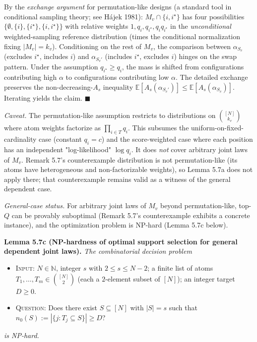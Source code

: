 \documentclass[
]{article}
\begin{document}
By the \emph{exchange argument} for permutation-like designs (a
standard tool in conditional sampling theory; see Hájek 1981):
$M_v \cap \{i, i^\star\}$ has four possibilities
$\{\emptyset, \{i\}, \{i^\star\}, \{i, i^\star\}\}$ with relative
weights $1, q_i, q_{i^\star}, q_i q_{i^\star}$ in the
\emph{unconditional} weighted-sampling reference distribution
(times the conditional normalization fixing $|M_v| = k_v$). Conditioning on the rest of $M_v$, the comparison
between $\alpha_{S_v}$ (excludes $i^\star$, includes $i$) and
$\alpha_{S_v'}$ (includes $i^\star$, excludes $i$) hinges on the
swap pattern. Under the assumption $q_{i^\star} \geq q_i$, the mass
is shifted from configurations contributing high $\alpha$ to
configurations contributing low $\alpha$. The detailed exchange
preserves the non-decreasing-$A_s$ inequality
$\mathbb{E}[A_s(\alpha_{S_v'})] \leq \mathbb{E}[A_s(\alpha_{S_v})]$.
Iterating yields the claim. \hfill$\blacksquare$

\emph{Caveat.} The permutation-like assumption restricts to
distributions on $\binom{[N]}{k_v}$ where atom weights factorize as
$\prod_{i \in T} q_i$. This subsumes the uniform-on-fixed-cardinality
case (constant $q_i = c$) and the score-weighted case where each
position has an independent "log-likelihood" $\log q_i$. It does
\emph{not} cover arbitrary joint laws of $M_v$. Remark 5.7's
counterexample distribution is not permutation-like (its atoms
have heterogeneous and non-factorizable weights), so Lemma 5.7a
does not apply there; that counterexample remains valid as a
witness of the general dependent case.

\emph{General-case status.} For arbitrary joint laws of $M_v$
beyond permutation-like, top-$Q$ can be provably suboptimal (Remark
5.7's counterexample exhibits a concrete instance), and the
optimization problem is NP-hard (Lemma 5.7c below).

\textbf{Lemma 5.7c (NP-hardness of optimal support selection for
general dependent joint laws).} \emph{The combinatorial decision problem}
\begin{itemize}
\item \textsc{Input}: $N \in \mathbb{N}$, integer $s$ with
$2 \leq s \leq N - 2$; a finite list of atoms
$T_1, \ldots, T_m \in \binom{[N]}{2}$ (each a $2$-element subset of
$[N]$); an integer target $D \geq 0$.
\item \textsc{Question}: Does there exist $S \subseteq [N]$ with
$|S| = s$ such that
$n_0(S) := |\{j : T_j \subseteq S\}| \geq D$?
\end{itemize}
\emph{is NP-hard.}
\end{document}
